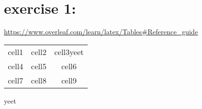 \section{exercise 1:}
\url{https://www.overleaf.com/learn/latex/Tables#Reference_guide}
\begin{center}
	\begin{tabular}{ |c|c|c| }
		\hline
		cell1 & cell2 & cell3yeet \\
		cell4 & cell5 & cell6     \\
		cell7 & cell8 & cell9     \\
		\hline
	\end{tabular}
\end{center}
yeet
